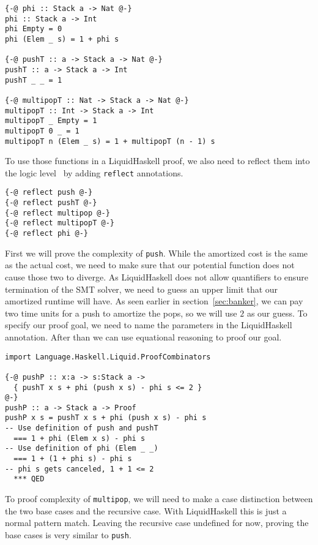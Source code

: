 \documentclass[sigplan,screen]{acmart}
\begin{document}
\begin{lstlisting}
{-@ phi :: Stack a -> Nat @-}
phi :: Stack a -> Int
phi Empty = 0
phi (Elem _ s) = 1 + phi s

{-@ pushT :: a -> Stack a -> Nat @-}
pushT :: a -> Stack a -> Int
pushT _ _ = 1

{-@ multipopT :: Nat -> Stack a -> Nat @-}
multipopT :: Int -> Stack a -> Int
multipopT _ Empty = 1
multipopT 0 _ = 1
multipopT n (Elem _ s) = 1 + multipopT (n - 1) s
\end{lstlisting}

To use those functions in a LiquidHaskell proof, we also need to reflect them into the logic level~\cite{reflection} by adding \texttt{reflect} annotations.

\begin{lstlisting}
{-@ reflect push @-}
{-@ reflect pushT @-}
{-@ reflect multipop @-}
{-@ reflect multipopT @-}
{-@ reflect phi @-}
\end{lstlisting}

First we will prove the complexity of \texttt{push}. While the amortized cost is the same as the actual cost, we need to make sure that our potential function does not cause those two to diverge. As LiquidHaskell does not allow quantifiers to ensure termination of the SMT solver, we need to guess an upper limit that our amortized runtime will have. As seen earlier in section~\ref{sec:banker}, we can pay two time units for a push to amortize the pops, so we will use $2$ as our guess. To specify our proof goal, we need to name the parameters in the LiquidHaskell annotation. After than we can use equational reasoning to proof our goal.

\begin{lstlisting}
import Language.Haskell.Liquid.ProofCombinators

{-@ pushP :: x:a -> s:Stack a ->
  { pushT x s + phi (push x s) - phi s <= 2 }
@-}
pushP :: a -> Stack a -> Proof
pushP x s = pushT x s + phi (push x s) - phi s
-- Use definition of push and pushT
  === 1 + phi (Elem x s) - phi s
-- Use definition of phi (Elem _ _)
  === 1 + (1 + phi s) - phi s
-- phi s gets canceled, 1 + 1 <= 2
  *** QED
\end{lstlisting}

To proof complexity of \texttt{multipop}, we will need to make a case distinction between the two base cases and the recursive case. With LiquidHaskell this is just a normal pattern match. Leaving the recursive case undefined for now, proving the base cases is very similar to \texttt{push}.
\end{document}
